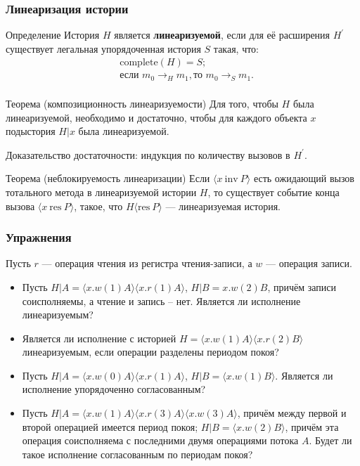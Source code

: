 \documentclass[aspectratio=169, pdf, 8pt, unicode]{beamer}
\newcounter{defCnt}
\newcounter{thmCnt}
\begin{document}
\begin{frame}
\frametitle{Линеаризация истории}

\begin{block}{Определение }
    История $H$ является \textbf{линеаризуемой}, если для её расширения $H^{\prime}$ существует легальная упорядоченная история $S$
    такая, что:
    \begin{equation}
    \begin{aligned}
        & \mathrm{complete}(H) = S;\\
        & \text{если } m_0 \to_H m_1, \text{то } m_0 \to_S m_1.\\
    \end{aligned}
    \end{equation}
\end{block}

\begin{block}{Теорема  (композиционность линеаризуемости)}
    Для того, чтобы $H$ была линеаризуемой, необходимо и достаточно, чтобы для каждого объекта $x$ подыстория $H|x$ была линеаризуемой.
\end{block}

Доказательство достаточности: индукция по количеству вызовов в $H^{\prime}$.

\begin{block}{Теорема  (неблокируемость линеаризации)}
    Если $\langle x \: \mathrm{inv} \: P \rangle$ есть ожидающий вызов тотального метода в линеаризуемой истории $H$, то существует событие конца вызова
    $\langle x \: \mathrm{res} \: P \rangle$, такое, что $H \langle \mathrm{res} \: P \rangle$ --- линеаризуемая история.
\end{block}

\end{frame}

\begin{frame}
\frametitle{Упражнения}
Пусть $r$ --- операция чтения из регистра чтения-записи, а $w$ --- операция записи.
\begin{itemize}
\setlength\itemsep{2em}
\item Пусть $H|A = \langle x.w(1)A \rangle \langle x.r(1)A \rangle$, $H|B = x.w(2)B$, причём записи соисполняемы, а чтение и запись -- нет.
    Является ли исполнение линеаризуемым?
    \item Является ли исполнение с историей $H = \langle x.w(1)A \rangle \langle x.r(2)B \rangle$ линеаризуемым, если операции разделены периодом покоя?
    \item Пусть $H|A = \langle x.w(0)A \rangle \langle x.r(1)A \rangle$, $H|B = \langle x.w(1)B \rangle$. Является ли исполнение упорядоченно согласованным?
    \item Пусть $H|A = \langle x.w(1)A \rangle \langle x.r(3)A \rangle \langle x.w(3)A \rangle$, причём между первой и второй операцией имеется
        период покоя; $H|B = \langle x.w(2)B \rangle$, причём эта операция соисполняема с последними двумя операциями потока $A$.
        Будет ли такое исполнение согласованным по периодам покоя?

\end{itemize}
\end{frame}
\end{document}

